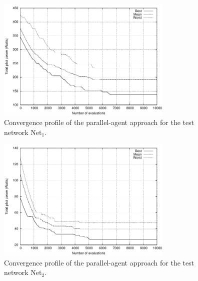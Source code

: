 \begin{figure}
\centering

\includegraphics[width=0.75\textwidth]{06-experimental_evaluation-service_coverage/img/convergence_first}

\caption{Convergence profile of the parallel-agent approach for the test network
Net$_{1}$.\emph{\label{fig:06-Convergence_Net1}}}
\end{figure}


\begin{figure}
\centering

\includegraphics[width=0.75\textwidth]{06-experimental_evaluation-service_coverage/img/convergence_second}

\caption{Convergence profile of the parallel-agent approach for the test network
Net$_{2}$.\emph{\label{fig:06-Convergence_Net2}}}
\end{figure}


